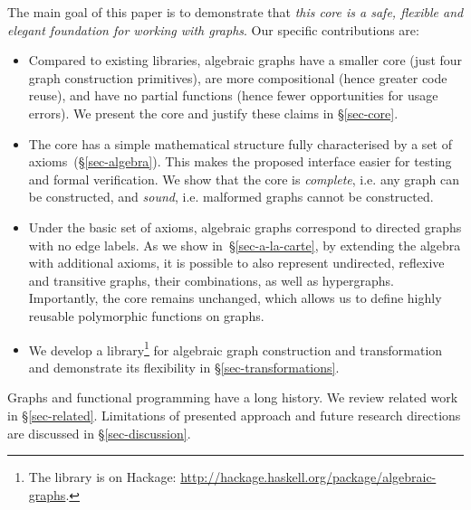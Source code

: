 The main goal of this paper is to demonstrate that \emph{this core is a safe, flexible
and elegant foundation for working with graphs}. Our specific contributions are:
\begin{itemize}
  \item Compared to existing libraries, algebraic graphs have a smaller
  core (just four graph construction primitives), are more compositional
  (hence greater code reuse), and have no partial functions (hence fewer
  opportunities for usage errors). We present the core and justify these claims
  in \S\ref{sec-core}.
  \vspace{0.5mm}

  \item The core has a simple mathematical structure fully characterised
  by a set of axioms~(\S\ref{sec-algebra}). This makes the
  proposed interface easier for testing and formal verification. We show that
  the core is \emph{complete}, i.e. any graph can be constructed, and \emph{sound},
  i.e. malformed graphs cannot be constructed.
  \vspace{0.5mm}

  \item Under the basic set of axioms, algebraic graphs correspond to directed
  graphs with no edge labels. As we show in~\S\ref{sec-a-la-carte}, by extending
  the algebra   with additional axioms, it is possible to also represent undirected,
  reflexive and transitive graphs, their combinations, as well as hypergraphs.
  Importantly, the core remains unchanged, which allows us to define highly
  reusable polymorphic functions on graphs.
  \vspace{0.5mm}

  \item We develop a library\footnote{The library is on Hackage:
  \url{http://hackage.haskell.org/package/algebraic-graphs}.}
  for algebraic graph construction and transformation and demonstrate its
  flexibility in \S\ref{sec-transformations}.
\end{itemize}

Graphs and functional programming have a long history. We review related
work in \S\ref{sec-related}. Limitations of presented approach and future
research directions are discussed in \S\ref{sec-discussion}.
